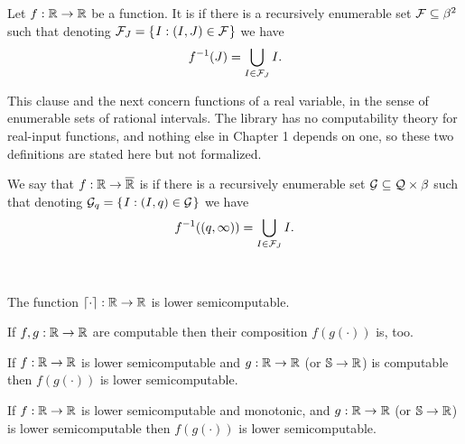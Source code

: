 \begin{definition}
  \label{def:computable-real-function}
  \notready
Let \( f:\mathbb{R}\to\mathbb{R} \) be a function.
It is  if there is a recursively enumerable set 
\( \mathcal{F}\subseteq \beta^{2} \)
such that denoting \( \mathcal{F}_{J}=\mathopen\{\mskip 1mu I: (I,J)\in \mathcal{F}\mskip 1mu\mathclose\} \) we have
 \begin{align*}
   f^{-1}(J) = \bigcup_{I\in\mathcal{F}_{J}}I.
 \end{align*}
\end{definition}

\begin{formalization}
This clause and the next concern functions of a real variable, in the sense of enumerable sets of rational intervals. The library has no computability theory for real-input functions, and nothing else in Chapter 1 depends on one, so these two definitions are stated here but not formalized.
\end{formalization}

\begin{definition}
  \label{def:lsc-real-function}
  \notready
  We say that \( f:\mathbb{R}\to\overline{\mathbb{R}} \) is
 if there is a recursively enumerable set 
\( \mathcal{G}\subseteq \mathcal{Q}\times\beta \)
such that denoting \( \mathcal{G}_{q}=\mathopen\{\mskip 1mu I: (I,q)\in \mathcal{G}\mskip 1mu\mathclose\} \) we have
 \begin{align*}
   f^{-1}((q,\infty)) = \bigcup_{I\in\mathcal{F}_{J}}I.
 \end{align*}
\end{definition}

\begin{proposition}
  \label{propo:l-sc-properties}\ 
  \begin{alphenum}
  \item 
  The function \( {\lceil \cdot\rceil}:\mathbb{R}\to\mathbb{R} \) is lower semicomputable.
  \item If \( f,g:\mathbb{R}\to\mathbb{R} \) are computable then their composition
    \( f(g(\cdot)) \) is, too.
  \item If \( f:\mathbb{R}\to\mathbb{R} \) is lower semicomputable and \( g:\mathbb{R}\to\mathbb{R} \) 
(or \( \mathbb{S}\to\mathbb{R} \)) is computable then \( f(g(\cdot)) \) is lower semicomputable.
  \item If \( f:\mathbb{R}\to\mathbb{R} \) is lower semicomputable and monotonic,
and \( g:\mathbb{R}\to\mathbb{R} \) (or \( \mathbb{S}\to\mathbb{R} \)) is lower 
semicomputable then \( f(g(\cdot)) \) is lower semicomputable.
  \end{alphenum}
\end{proposition}

